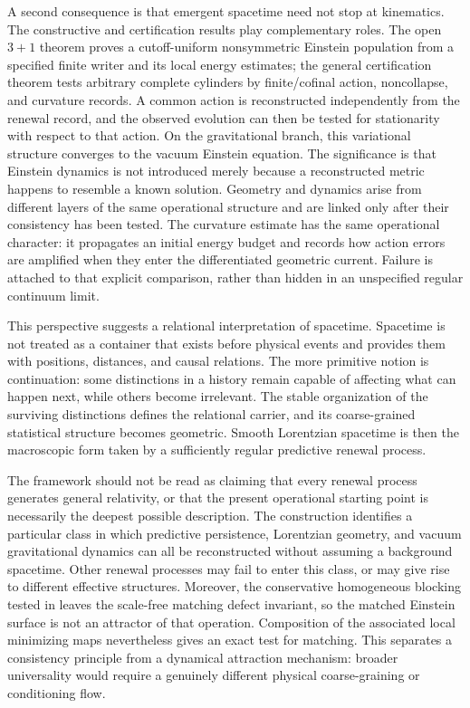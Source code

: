\documentclass[11pt]{article}
\theoremstyle{definition}
\theoremstyle{remark}
\begin{document}
A second consequence is that emergent spacetime need not stop at kinematics.
The constructive and certification results play complementary roles.  The
open $3+1$ theorem proves a cutoff-uniform nonsymmetric Einstein population
from a specified finite writer and its local energy estimates; the general
certification theorem tests arbitrary complete cylinders by finite/cofinal
action, noncollapse, and curvature records.  A common action is reconstructed
independently from the renewal record, and the observed evolution can then be
tested for stationarity with respect to that action.  On the gravitational branch, this variational structure converges to
the vacuum Einstein equation.  The significance is that Einstein dynamics is
not introduced merely because a reconstructed metric happens to resemble a
known solution.  Geometry and dynamics arise from different layers of the same
operational structure and are linked only after their consistency has been
tested.  The curvature estimate has the same operational character: it
propagates an initial energy budget and records how action errors are amplified
when they enter the differentiated geometric current.  Failure is attached to
that explicit comparison, rather than hidden in an unspecified regular
continuum limit.

This perspective suggests a relational interpretation of spacetime.  Spacetime
is not treated as a container that exists before physical events and provides
them with positions, distances, and causal relations.  The more primitive
notion is continuation: some distinctions in a history remain capable of
affecting what can happen next, while others become irrelevant.  The stable
organization of the surviving distinctions defines the relational carrier, and
its coarse-grained statistical structure becomes geometric.  Smooth Lorentzian
spacetime is then the macroscopic form taken by a sufficiently regular
predictive renewal process.

The framework should not be read as claiming that every renewal process
generates general relativity, or that the present operational starting point is
necessarily the deepest possible description.  The construction identifies a
particular class in which predictive persistence, Lorentzian geometry, and
vacuum gravitational dynamics can all be reconstructed without assuming a
background spacetime.  Other renewal processes may fail to enter this class,
or may give rise to different effective structures.  Moreover, the conservative
homogeneous blocking tested in  leaves the
scale-free matching defect invariant, so the matched Einstein surface is not an
attractor of that operation.  Composition of the associated local minimizing
maps nevertheless gives an exact test for matching.  This separates a
consistency principle from a dynamical attraction mechanism: broader
universality would require a genuinely different physical coarse-graining or
conditioning flow.
\end{document}
